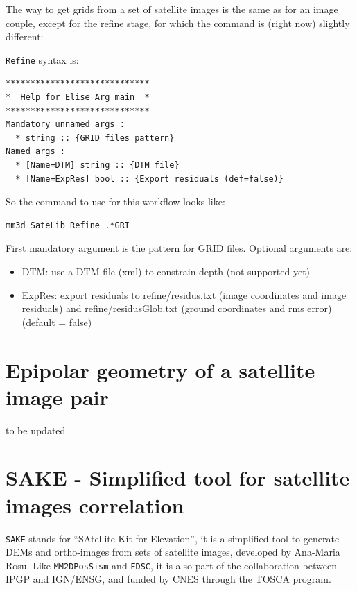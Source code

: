 The way to get grids from a set of satellite images is the same as for an image couple, except for the refine stage, for which the command is (right now) slightly different:

{\tt Refine} syntax is:

\begin{verbatim}
*****************************
*  Help for Elise Arg main  *
*****************************
Mandatory unnamed args :
  * string :: {GRID files pattern}
Named args :
  * [Name=DTM] string :: {DTM file}
  * [Name=ExpRes] bool :: {Export residuals (def=false)}
\end{verbatim}

So the command to use for this workflow looks like:
\begin{verbatim}
mm3d SateLib Refine .*GRI
\end{verbatim}

First mandatory argument is the pattern for GRID files. Optional arguments are:
\begin{itemize}
\item DTM: use a DTM file (xml) to constrain depth (not supported yet)
\item ExpRes: export residuals to refine/residus.txt (image coordinates and image residuals) and refine/residusGlob.txt (ground coordinates and rms error) (default = false)
\end{itemize}

%
\section{Epipolar geometry of a satellite image pair}\label{sec:epiSatel}
to be updated
%
\section{SAKE - Simplified tool for satellite images correlation}\label{sec:sake}

{\tt SAKE} stands for ``SAtellite Kit for Elevation'', it is a simplified tool to generate DEMs and ortho-images from sets of satellite images, developed by Ana-Maria Rosu. Like {\tt MM2DPosSism} and {\tt FDSC}, it is also part of the collaboration between IPGP and IGN/ENSG, and funded by CNES through the TOSCA program.

